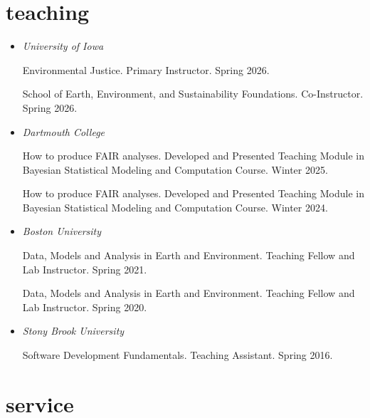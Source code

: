 \documentclass[10pt,oneside]{article}
\begin{document}

\section{teaching}

\mbox{}\vspace{-\dimexpr\baselineskip\relax}


\begin{itemize}[label={}]
  
  \item \textit{University of Iowa}
        
        Environmental Justice. Primary Instructor. Spring 2026.
        
        School of Earth, Environment, and Sustainability Foundations. Co-Instructor. Spring 2026.
        
        
  \item \textit{Dartmouth College}
        
        How to produce FAIR analyses. Developed and Presented Teaching Module in Bayesian Statistical Modeling and Computation Course. Winter 2025.
        
        How to produce FAIR analyses. Developed and Presented Teaching Module in Bayesian Statistical Modeling and Computation Course. Winter 2024.
        
        
  \item \textit{Boston University}
        
        Data, Models and Analysis in Earth and Environment. Teaching Fellow and Lab Instructor. Spring 2021.
        
        Data, Models and Analysis in Earth and Environment. Teaching Fellow and Lab Instructor. Spring 2020.
        
        
  \item \textit{Stony Brook University}
        
        Software Development Fundamentals. Teaching Assistant. Spring 2016.
        
        
\end{itemize}


\section{service}

\mbox{}\vspace{-\dimexpr\baselineskip\relax}
\end{document}
